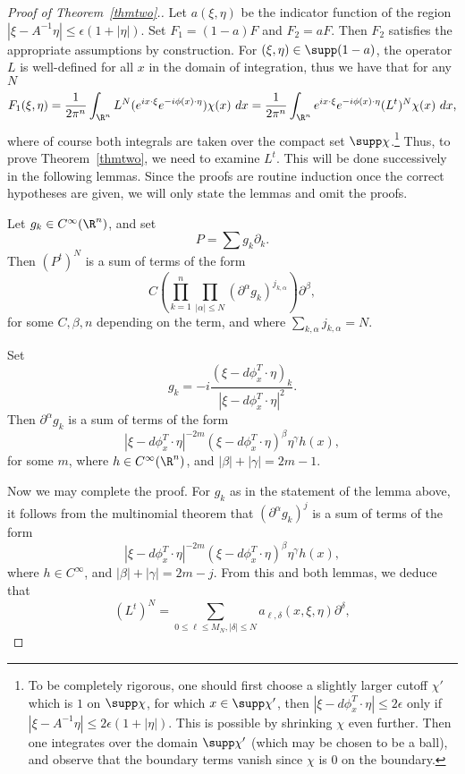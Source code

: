 \documentclass[12pt]{article}
\begin{document}
\begin{proof}[Proof of Theorem~\ref{thmtwo}.]
Let $a(\xi,\eta)$ be the indicator function of the region $|\xi-A^{-1}\eta| \leq \epsilon(1+|\eta|)$. Set $F_1 = (1-a)F$ and $F_2 = aF$. Then $F_2$ satisfies the appropriate assumptions by construction. For $(\xi,\eta) \in \supp (1-a)$, the operator $L$ is well-defined for all $x$ in the domain of integration, thus we have that for any $N$
\[F_1(\xi,\eta) = \frac{1}{2\pi^n}\int_{\R^n} L^N(e^{ix\cdot\xi}e^{-i\phi(x)\cdot \eta})\chi(x)\ dx = \frac{1}{2\pi^n}\int_{\R^n} e^{ix\cdot\xi}e^{-i\phi(x)\cdot \eta}(L^t)^N\chi(x)\ dx,\]
where of course both integrals are taken over the compact set $\supp \chi$.\footnote{To be completely rigorous, one should first choose a slightly larger cutoff $\chi'$ which is $1$ on $\supp \chi$, for which $x \in \supp \chi'$, then $|\xi - d\phi_x^T\cdot \eta| \leq 2\epsilon$ only if $|\xi-A^{-1}\eta| \leq 2\epsilon(1+|\eta|)$. This is possible by shrinking $\chi$ even further. Then one integrates over the domain $\supp \chi'$ (which may be chosen to be a ball), and observe that the boundary terms vanish since $\chi$ is $0$ on the boundary.}
Thus, to prove Theorem~\ref{thmtwo}, we need to examine $L^t$. This will be done successively in the following lemmas. Since the proofs are routine induction once the correct hypotheses are given, we will only state the lemmas and omit the proofs.
\begin{lem}Let $g_k \in C^\infty(\R^n)$, and set
\[P = \sum g_k\partial_k.\]
Then $(P^t)^N$ is a sum of terms of the form
\[C\left(\prod_{k=1}^n\prod_{|\alpha| \leq N} (\partial^{\alpha}g_k)^{j_{k,\alpha}}\right)\partial^{\beta},\]
for some $C,\beta, n$ depending on the term, and where $\sum_{k,\alpha} j_{k,\alpha} = N$.\end{lem}
\begin{lem}Set \[g_k = -i\frac{(\xi-d\phi_x^T\cdot \eta)_k}{|\xi-d\phi_x^T\cdot \eta|^2}.\]
Then $\partial^{\alpha}g_k$ is a sum of terms of the form
\[|\xi-d\phi_x^T\cdot \eta|^{-2m}(\xi-d\phi_x^T\cdot\eta)^{\beta}\eta^{\gamma}h(x),\]
for some $m$, where $h \in C^\infty(\R^n)$, and $|\beta|+|\gamma| = 2m-1$.\end{lem}
Now we may complete the proof. For $g_k$ as in the statement of the lemma above, it follows from the multinomial theorem that $(\partial^{\alpha}g_k)^j$ is a sum of terms of the form
\[|\xi-d\phi_x^T\cdot \eta|^{-2m}(\xi-d\phi_x^T\cdot\eta)^{\beta}\eta^{\gamma}h(x),\]
where $h \in C^\infty$, and $|\beta|+|\gamma| = 2m-j$.
From this and both lemmas, we deduce that
\[(L^t)^N = \sum_{0 \leq \ell\leq M_N,|\delta| \leq N} a_{\ell,\delta}(x,\xi,\eta)\partial^{\delta},\]

\end{proof}
\end{document}
